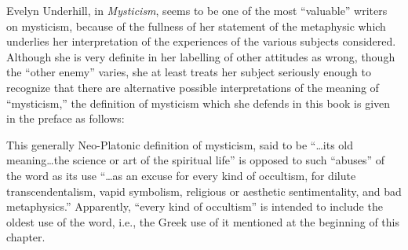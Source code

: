 Evelyn Underhill, in \emph{Mysticism}, seems to be one of the
most \enquote{valuable} writers on mysticism, because of the fullness
of her statement of the metaphysic which underlies her interpretation
of the experiences of the various subjects considered.
Although she is very definite in her labelling
of other attitudes as wrong, though the \enquote{other enemy} varies,
she at least treats her subject seriously enough to recognize
that there are alternative possible interpretations of the
meaning of \enquote{mysticism,} the definition of mysticism which
she defends in this book is given in the preface as follows:

\clearpage


This generally Neo-Platonic definition of mysticism, said to
be \enquote{\dots its old meaning\dots the science or art of the spiritual
life}\supercite{underhill:mysticism}
is opposed to such \enquote{abuses} of the word as its use
\enquote{\dots as an excuse for every kind of occultism, for dilute
transcendentalism, vapid symbolism, religious or aesthetic
sentimentality, and bad metaphysics.}\supercite{underhill:mysticism}
Apparently, \enquote{every kind of occultism} is intended to include the oldest use of
the word, i.e., the Greek use of it mentioned at the beginning
of this chapter.

\label{self:12}

